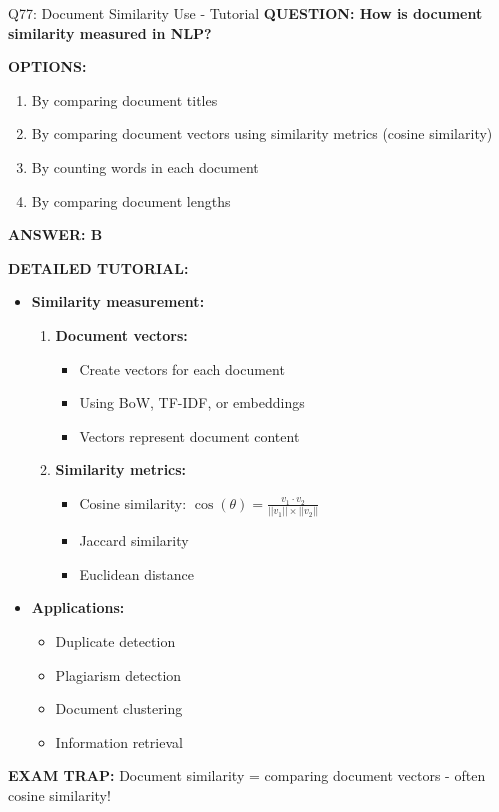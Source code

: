 \documentclass[8pt]{beamer}
\begin{document}
	\begin{frame}{Q77: Document Similarity Use - Tutorial}
		\fontsize{6.5}{7.5}\selectfont
		\textbf{QUESTION: How is document similarity measured in NLP?}
		
		\vspace{0.1cm}
		\textbf{OPTIONS:}
		\begin{enumerate}
			\item By comparing document titles
			\item By comparing document vectors using similarity metrics (cosine similarity)
			\item By counting words in each document
			\item By comparing document lengths
		\end{enumerate}
		
		\vspace{0.1cm}
		\textcolor{myblue}{\textbf{ANSWER: B}}
		
		\vspace{0.1cm}
		\textbf{DETAILED TUTORIAL:}
		\begin{itemize}
			\item \textbf{Similarity measurement:}
			\begin{enumerate}
				\item \textbf{Document vectors:}
				\begin{itemize}
					\item Create vectors for each document
					\item Using BoW, TF-IDF, or embeddings
					\item Vectors represent document content
				\end{itemize}
				\item \textbf{Similarity metrics:}
				\begin{itemize}
					\item Cosine similarity: $\cos(\theta) = \frac{v_1 \cdot v_2}{||v_1|| \times ||v_2||}$
					\item Jaccard similarity
					\item Euclidean distance
				\end{itemize}
			\end{enumerate}
			\item \textbf{Applications:}
			\begin{itemize}
				\item Duplicate detection
				\item Plagiarism detection
				\item Document clustering
				\item Information retrieval
			\end{itemize}
		\end{itemize}
		
		\textcolor{myred}{\textbf{EXAM TRAP:}} Document similarity = \textcolor{myblue}{comparing document vectors} - often cosine similarity!
	\end{frame}
	
\end{document}
